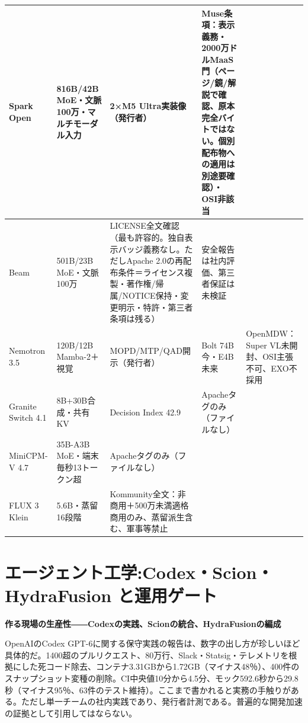 \documentclass[lualatex,a4paper,10pt]{jlreq}
\begin{document}
\begin{strip}
\centering\footnotesize
{}
\begin{tabularx}{0.96\linewidth}{@{}lXXXX@{}}
\toprule
Spark Open & 816B/42B MoE・文脈100万・マルチモーダル入力 & 2×M5 Ultra実装像（発行者） & Muse条項：表示義務・2000万ドルMaaS門（ページ/鏡/解説で確認、原本完全バイトではない。個別配布物への適用は別途要確認）・OSI非該当 \cite{B14,B70,B15,B13} \\
\midrule
Beam & 501B/23B MoE・文脈100万 & LICENSE全文確認（最も許容的。独自表示バッジ義務なし。ただしApache 2.0の再配布条件＝ライセンス複製・著作権/帰属/NOTICE保持・変更明示・特許・第三者条項は残る） & 安全報告は社内評価、第三者保証は未検証 \cite{B17,B19,B18,B16} \\
\midrule
Nemotron 3.5 & 120B/12B Mamba-2＋視覚 & MOPD/MTP/QAD開示（発行者） & Bolt 74B今・E4B未来 & OpenMDW：Super VL未開封、OSI主張不可、EXO不採用 \cite{B21,B72,B22,B20} \\
\midrule
Granite Switch 4.1 & 8B+30B合成・共有KV & Decision Index 42.9 & Apacheタグのみ（ファイルなし） \cite{B24,B73,B23,B25} \\
\midrule
MiniCPM-V 4.7 & 35B-A3B MoE・端末毎秒13トークン超 & Apacheタグのみ（ファイルなし） \cite{B27,B74,B26} \\
\midrule
FLUX 3 Klein & 5.6B・蒸留16段階 & Kommunity全文：非商用＋500万未満適格商用のみ、蒸留派生含む、軍事等禁止 \cite{B29,B28,B30} \\
\bottomrule
\end{tabularx}
\end{strip}

\section{エージェント工学:Codex・Scion・HydraFusion と運用ゲート}
\label{sec:P4}
{\Large\bfseries 作る現場の生産性――Codexの実践、Scionの統合、HydraFusionの編成\par}
\bigskip
OpenAIのCodex GPT-6に関する保守実践の報告は、数字の出し方が珍しいほど具体的だ。1400超のプルリクエスト、80万行、Slack・Statsig・テレメトリを根拠にした死コード除去、コンテナ3.31GBから1.72GB（マイナス48％）、400件のスナップショット変種の削除。CI中央値10分から4.5分、モック592.6秒から29.8秒（マイナス95％、63件のテスト維持）。ここまで書かれると実務の手触りがある。ただし単一チームの社内実践であり、発行者計測である。普遍的な開発加速の証拠として引用してはならない。
\cite{B31}
\end{document}
